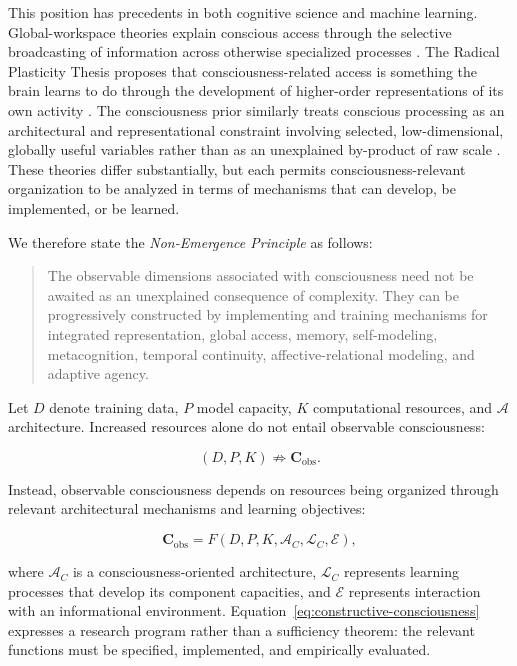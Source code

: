 This position has precedents in both cognitive science and machine learning. Global-workspace theories explain conscious access through the selective broadcasting of information across otherwise specialized processes \cite{baars1988cognitive,dehaene2011experimental,mashour2020conscious}. The Radical Plasticity Thesis proposes that consciousness-related access is something the brain learns to do through the development of higher-order representations of its own activity \cite{cleeremans2011radical}. The consciousness prior similarly treats conscious processing as an architectural and representational constraint involving selected, low-dimensional, globally useful variables rather than as an unexplained by-product of raw scale \cite{bengio2017consciousness}. These theories differ substantially, but each permits consciousness-relevant organization to be analyzed in terms of mechanisms that can develop, be implemented, or be learned.

We therefore state the \emph{Non-Emergence Principle} as follows:

\begin{quote}
The observable dimensions associated with consciousness need not be awaited as an unexplained consequence of complexity. They can be progressively constructed by implementing and training mechanisms for integrated representation, global access, memory, self-modeling, metacognition, temporal continuity, affective-relational modeling, and adaptive agency.
\end{quote}

Let $D$ denote training data, $P$ model capacity, $K$ computational resources, and $\mathcal{A}$ architecture. Increased resources alone do not entail observable consciousness:

\begin{equation}
(D,P,K) \not\Rightarrow \mathbf{C}_{\mathrm{obs}}.
\label{eq:scale-insufficient}
\end{equation}

Instead, observable consciousness depends on resources being organized through relevant architectural mechanisms and learning objectives:

\begin{equation}
\mathbf{C}_{\mathrm{obs}}
=
F(D,P,K,\mathcal{A}_{C},\mathcal{L}_{C},\mathcal{E}),
\label{eq:constructive-consciousness}
\end{equation}

where $\mathcal{A}_{C}$ is a consciousness-oriented architecture, $\mathcal{L}_{C}$ represents learning processes that develop its component capacities, and $\mathcal{E}$ represents interaction with an informational environment. Equation~\ref{eq:constructive-consciousness} expresses a research program rather than a sufficiency theorem: the relevant functions must be specified, implemented, and empirically evaluated.

